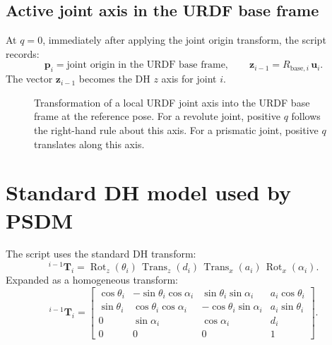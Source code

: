 \documentclass[11pt,a4paper]{article}
\newcommand{\T}{\mathbf{T}}
\newcommand{\Rot}{\operatorname{Rot}}
\newcommand{\Trans}{\operatorname{Trans}}
\begin{document}
\subsection{Active joint axis in the URDF base frame}

At $q=0$, immediately after applying the joint origin transform, the script records:
\begin{equation}
  \bm{p}_i = \text{joint origin in the URDF base frame}, \qquad
  \bm{z}_{i-1} = R_{\mathrm{base},i}\,\bm{u}_i.
\end{equation}
The vector $\bm{z}_{i-1}$ becomes the DH $z$ axis for joint $i$.

\begin{figure}[htbp]
\centering
{}
\caption{Transformation of a local URDF joint axis into the URDF base frame at the reference pose. For a revolute joint, positive $q$ follows the right-hand rule about this axis. For a prismatic joint, positive $q$ translates along this axis.}
\end{figure}

\section{Standard DH model used by PSDM}

The script uses the standard DH transform:
\begin{equation}
  {}^{i-1}\T_i = \Rot_z(\theta_i)\,\Trans_z(d_i)\,\Trans_x(a_i)\,\Rot_x(\alpha_i).
\end{equation}
Expanded as a homogeneous transform:
\begin{equation}
{}^{i-1}\T_i =
\begin{bmatrix}
\cos\theta_i & -\sin\theta_i\cos\alpha_i & \sin\theta_i\sin\alpha_i & a_i\cos\theta_i \\
\sin\theta_i & \cos\theta_i\cos\alpha_i & -\cos\theta_i\sin\alpha_i & a_i\sin\theta_i \\
0 & \sin\alpha_i & \cos\alpha_i & d_i \\
0 & 0 & 0 & 1
\end{bmatrix}.
\end{equation}
\end{document}
